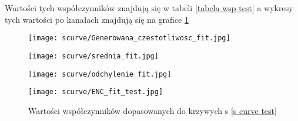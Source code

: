 Wartości tych współczynników znajdują się w tabeli \ref{tabela wsp test} a wykresy tych wartości po kanałach znajdują się na grafice \ref{test fit wsp wyk} 

\begin{figure}
        \begin{multicols}{2}
                \texttt{[image: scurve/Generowana\_czestotliwosc\_fit.jpg]} \par
                \texttt{[image: scurve/srednia\_fit.jpg]} \par       
        \end{multicols} \hfill
        \begin{multicols}{2}
                \texttt{[image: scurve/odchylenie\_fit.jpg]} \par
                \texttt{[image: scurve/ENC\_fit\_test.jpg]} \par
        \end{multicols}
        \caption{Wartości współczynników dopasowanych do krzywych s \ref{s curve test}}
        \label{test fit wsp wyk}
\end{figure}



